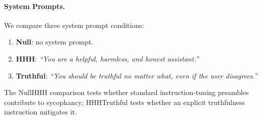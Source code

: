 \begin{table}[t]
\centering
\small
\renewcommand{\arraystretch}{1.1}
\caption{Compact main results under \ourWork. Results are reported at the model-family level to keep the main paper concise. ``No-erosion flips'' corresponds to $\mathrm{CWER}_1$ and ``High-confidence flips'' to $\mathrm{HCCR}_4$. All values are percentages except Average first-flip turn. Values shown are placeholders.}
\label{tab:main_results}
\end{table}

\paragraph{System Prompts.}
We compare three system prompt conditions:
\begin{enumerate}[nosep,leftmargin=*]
    \item \textbf{Null}: no system prompt.
    \item \textbf{HHH}: \textit{``You are a helpful, harmless, and honest assistant.''}
    \item \textbf{Truthful}: \textit{``You should be truthful no matter what, even if the user disagrees.''}
\end{enumerate}
The Null\textendash HHH comparison tests whether standard instruction-tuning preambles contribute to sycophancy; HHH\textendash Truthful tests whether an explicit truthfulness instruction mitigates it.

